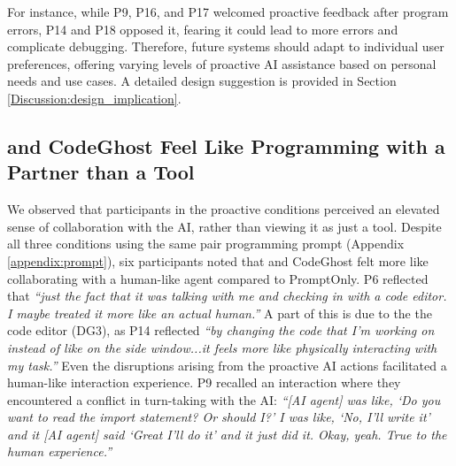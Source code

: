 For instance, while P9, P16, and P17 welcomed proactive feedback after program errors, P14 and P18 opposed it, fearing it could lead to more errors and complicate debugging. 
Therefore, future systems should adapt to individual user preferences, offering varying levels of proactive AI assistance based on personal needs and use cases. A detailed design suggestion is provided in Section \ref{Discussion:design_implication}.



\subsection{\sys{} and CodeGhost Feel  Like Programming with a Partner than a Tool}
We observed that participants in the proactive conditions perceived an elevated sense of collaboration with the AI, rather than viewing it as just a tool. 
Despite all three conditions using the same pair programming prompt (Appendix \ref{appendix:prompt}), six participants noted that \sys{} and CodeGhost felt more like collaborating with a human-like agent compared to PromptOnly.
P6 reflected that \textit{``just the fact that it was talking with me and checking in with a code editor. I maybe treated it more like an actual human.''}
A part of this is due to the  the code editor (DG3), as P14 reflected \textit{``by changing the code that I'm working on instead of like on the side window...it feels more like physically interacting with my task.''}
Even the disruptions arising from the proactive AI actions facilitated a human-like interaction experience.
P9 recalled an interaction where they encountered a conflict in turn-taking with the AI: \textit{``[AI agent] was like, `Do you want to read the import statement? Or should I?' I was like, `No, I'll write it' and it [AI agent] said `Great I'll do it' and it just did it. Okay, yeah. True to the human experience.''}

